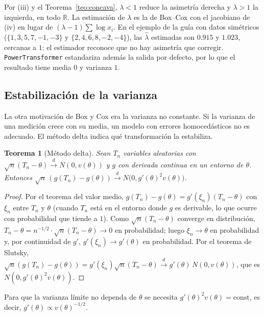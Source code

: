 \documentclass[11pt]{article}
\newtheorem{teorema}{Teorema}[section]
\theoremstyle{definition}
\theoremstyle{remark}
\newcommand{\R}{\mathbb{R}}
\begin{document}
\noindent Por (iii) y el Teorema~\ref{teo:concava}, $\lambda<1$ reduce la asimetría derecha y $\lambda>1$ la izquierda, en todo $\R$. La estimación de $\lambda$ es la de Box--Cox con el jacobiano de (iv) en lugar de $(\lambda-1)\sum\log x_i$. En el ejemplo de la guía con datos simétricos ($\{1,3,5,7,-1,-3\}$ y $\{2,4,6,8,-2,-4\}$), las $\hat\lambda$ estimadas son $0.915$ y $1.023$, cercanas a $1$: el estimador reconoce que no hay asimetría que corregir. \texttt{PowerTransformer} estandariza además la salida por defecto, por lo que el resultado tiene media $0$ y varianza $1$.

\subsection{Estabilización de la varianza}\label{sec:estabilizacion}

\noindent La otra motivación de Box y Cox era la varianza no constante. Si la varianza de una medición crece con su media, un modelo con errores homocedásticos no es adecuado. El método delta indica qué transformación la estabiliza.

\begin{teorema}[Método delta]\label{teo:delta}
\noindent Sean $T_n$ variables aleatorias con $\sqrt n(T_n-\theta)\xrightarrow{d}N(0,v(\theta))$ y $g$ con derivada continua en un entorno de $\theta$. Entonces $\sqrt n\,(g(T_n)-g(\theta))\xrightarrow{d}N\big(0,g'(\theta)^2v(\theta)\big)$.
\end{teorema}
\begin{proof}
\noindent Por el teorema del valor medio, $g(T_n)-g(\theta)=g'(\xi_n)(T_n-\theta)$ con $\xi_n$ entre $T_n$ y $\theta$ (cuando $T_n$ está en el entorno donde $g$ es derivable, lo que ocurre con probabilidad que tiende a $1$). Como $\sqrt n(T_n-\theta)$ converge en distribución, $T_n-\theta=n^{-1/2}\cdot\sqrt n(T_n-\theta)\to0$ en probabilidad; luego $\xi_n\to\theta$ en probabilidad y, por continuidad de $g'$, $g'(\xi_n)\to g'(\theta)$ en probabilidad. Por el teorema de Slutsky, $\sqrt n(g(T_n)-g(\theta))=g'(\xi_n)\sqrt n(T_n-\theta)\xrightarrow{d}g'(\theta)\,N(0,v(\theta))$, que es $N(0,g'(\theta)^2v(\theta))$.
\end{proof}

\noindent Para que la varianza límite no dependa de $\theta$ se necesita $g'(\theta)^2v(\theta)=\text{const}$, es decir, $g'(\theta)\propto v(\theta)^{-1/2}$.
\end{document}
